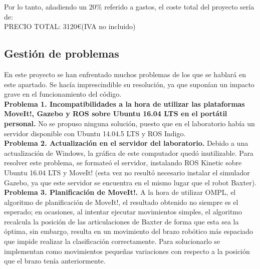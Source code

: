 \noindent Por lo tanto, añadiendo un 20\% referido a gastos, el coste total del proyecto sería de: \\

PRECIO TOTAL: 3120\euro (IVA no incluido)\\

\subsection{Gestión de problemas}
\label{planif}
\noindent En este proyecto se han enfrentado muchos problemas de los que se hablará en este apartado. Se hacía imprescindible su resolución, ya que suponían un impacto grave en el funcionamiento del código.\\

\noindent \textbf{Problema 1. Incompatibilidades a la hora de utilizar las plataformas MoveIt!, Gazebo y ROS sobre Ubuntu 16.04 LTS en el portátil personal.} No se propuso ninguna solución, puesto que en el laboratorio había un servidor disponible con Ubuntu 14.04.5 LTS y ROS Indigo. \\

\noindent \textbf{Problema 2. Actualización en el servidor del laboratorio.} Debido a una actualización de Windows, la gráfica de este computador quedó inutilizable. Para resolver este problema, se formateó el servidor, instalando ROS Kinetic sobre Ubuntu 16.04 LTS y MoveIt! (esta vez no resultó necesario instalar el simulador Gazebo, ya que este servidor se encuentra en el mismo lugar que el robot Baxter). \\

\noindent \textbf{Problema 3. Planificación de MoveIt!.} A la hora de utilizar OMPL, el algoritmo de planificación de MoveIt!, el resultado obtenido no siempre es el esperado; en ocasiones, al intentar ejecutar movimientos simples, el algoritmo recalcula la posición de las articulaciones de Baxter de forma que esta sea la óptima, sin embargo, resulta en un movimiento del brazo robótico más espaciado que impide realizar la clasificación correctamente. Para solucionarlo se implementan como movimientos pequeñas variaciones con respecto a la posición que el brazo tenía anteriormente.\\


